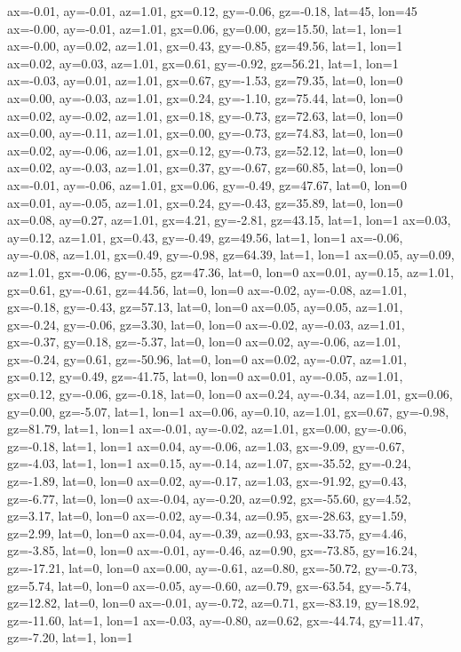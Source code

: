ax=-0.01, ay=-0.01, az=1.01, gx=0.12, gy=-0.06, gz=-0.18, lat=45, lon=45
ax=-0.00, ay=-0.01, az=1.01, gx=0.06, gy=0.00, gz=15.50, lat=1, lon=1
ax=-0.00, ay=0.02, az=1.01, gx=0.43, gy=-0.85, gz=49.56, lat=1, lon=1
ax=0.02, ay=0.03, az=1.01, gx=0.61, gy=-0.92, gz=56.21, lat=1, lon=1
ax=-0.03, ay=0.01, az=1.01, gx=0.67, gy=-1.53, gz=79.35, lat=0, lon=0
ax=0.00, ay=-0.03, az=1.01, gx=0.24, gy=-1.10, gz=75.44, lat=0, lon=0
ax=0.02, ay=-0.02, az=1.01, gx=0.18, gy=-0.73, gz=72.63, lat=0, lon=0
ax=0.00, ay=-0.11, az=1.01, gx=0.00, gy=-0.73, gz=74.83, lat=0, lon=0
ax=0.02, ay=-0.06, az=1.01, gx=0.12, gy=-0.73, gz=52.12, lat=0, lon=0
ax=0.02, ay=-0.03, az=1.01, gx=0.37, gy=-0.67, gz=60.85, lat=0, lon=0
ax=-0.01, ay=-0.06, az=1.01, gx=0.06, gy=-0.49, gz=47.67, lat=0, lon=0
ax=0.01, ay=-0.05, az=1.01, gx=0.24, gy=-0.43, gz=35.89, lat=0, lon=0
ax=0.08, ay=0.27, az=1.01, gx=4.21, gy=-2.81, gz=43.15, lat=1, lon=1
ax=0.03, ay=0.12, az=1.01, gx=0.43, gy=-0.49, gz=49.56, lat=1, lon=1
ax=-0.06, ay=-0.08, az=1.01, gx=0.49, gy=-0.98, gz=64.39, lat=1, lon=1
ax=0.05, ay=0.09, az=1.01, gx=-0.06, gy=-0.55, gz=47.36, lat=0, lon=0
ax=0.01, ay=0.15, az=1.01, gx=0.61, gy=-0.61, gz=44.56, lat=0, lon=0
ax=-0.02, ay=-0.08, az=1.01, gx=-0.18, gy=-0.43, gz=57.13, lat=0, lon=0
ax=0.05, ay=0.05, az=1.01, gx=-0.24, gy=-0.06, gz=3.30, lat=0, lon=0
ax=-0.02, ay=-0.03, az=1.01, gx=-0.37, gy=0.18, gz=-5.37, lat=0, lon=0
ax=0.02, ay=-0.06, az=1.01, gx=-0.24, gy=0.61, gz=-50.96, lat=0, lon=0
ax=0.02, ay=-0.07, az=1.01, gx=0.12, gy=0.49, gz=-41.75, lat=0, lon=0
ax=0.01, ay=-0.05, az=1.01, gx=0.12, gy=-0.06, gz=-0.18, lat=0, lon=0
ax=0.24, ay=-0.34, az=1.01, gx=0.06, gy=0.00, gz=-5.07, lat=1, lon=1
ax=0.06, ay=0.10, az=1.01, gx=0.67, gy=-0.98, gz=81.79, lat=1, lon=1
ax=-0.01, ay=-0.02, az=1.01, gx=0.00, gy=-0.06, gz=-0.18, lat=1, lon=1
ax=0.04, ay=-0.06, az=1.03, gx=-9.09, gy=-0.67, gz=-4.03, lat=1, lon=1
ax=0.15, ay=-0.14, az=1.07, gx=-35.52, gy=-0.24, gz=-1.89, lat=0, lon=0
ax=0.02, ay=-0.17, az=1.03, gx=-91.92, gy=0.43, gz=-6.77, lat=0, lon=0
ax=-0.04, ay=-0.20, az=0.92, gx=-55.60, gy=4.52, gz=3.17, lat=0, lon=0
ax=-0.02, ay=-0.34, az=0.95, gx=-28.63, gy=1.59, gz=2.99, lat=0, lon=0
ax=-0.04, ay=-0.39, az=0.93, gx=-33.75, gy=4.46, gz=-3.85, lat=0, lon=0
ax=-0.01, ay=-0.46, az=0.90, gx=-73.85, gy=16.24, gz=-17.21, lat=0, lon=0
ax=0.00, ay=-0.61, az=0.80, gx=-50.72, gy=-0.73, gz=5.74, lat=0, lon=0
ax=-0.05, ay=-0.60, az=0.79, gx=-63.54, gy=-5.74, gz=12.82, lat=0, lon=0
ax=-0.01, ay=-0.72, az=0.71, gx=-83.19, gy=18.92, gz=-11.60, lat=1, lon=1
ax=-0.03, ay=-0.80, az=0.62, gx=-44.74, gy=11.47, gz=-7.20, lat=1, lon=1
